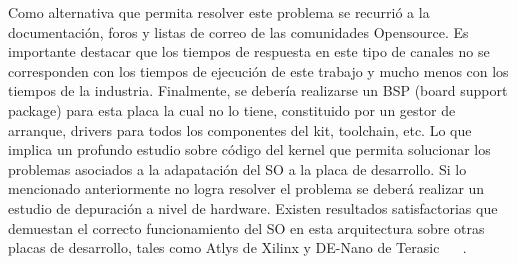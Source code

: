 		Como alternativa que permita resolver este problema se recurrió a la documentación, foros y listas de correo de las comunidades Opensource. Es importante
		destacar que los tiempos de respuesta en este tipo de canales no se corresponden con los tiempos de ejecución de este trabajo y mucho menos con los
		tiempos de la industria. Finalmente, se debería realizarse un BSP (board support package) para esta placa la cual no lo tiene, constituido por un gestor de arranque, drivers para todos los componentes del kit, toolchain, etc. Lo que implica un profundo estudio sobre código del kernel que permita solucionar los problemas asociados a la adapatación del SO a la placa de desarrollo. Si lo mencionado anteriormente no logra resolver el problema se deberá realizar un estudio de
		depuración a nivel de hardware. Existen resultados satisfactorias que demuestan el correcto funcionamiento del SO en esta arquitectura sobre otras
		placas de desarrollo, tales como Atlys de Xilinx y DE-Nano de Terasic ~\cite{rte.se} ~\cite{denano}.
		
		